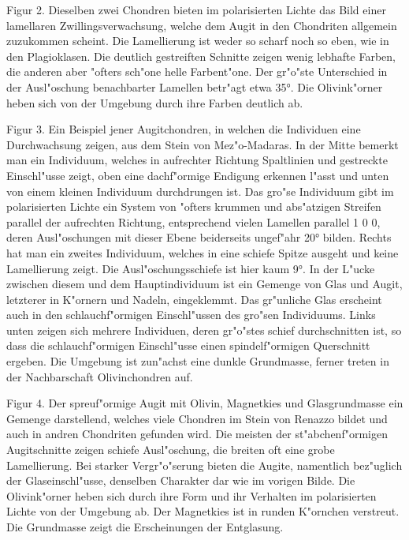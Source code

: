 \documentclass[a4paper, 11pt, oneside, polutonikogreek, german]{article}
\begin{document}
Figur 2. Dieselben zwei Chondren bieten im polarisierten Lichte das Bild einer lamellaren Zwillingsverwachsung, welche dem Augit in den Chondriten allgemein zuzukommen scheint. Die Lamellierung ist weder so scharf noch so eben, wie in den Plagioklasen. Die deutlich gestreiften Schnitte zeigen wenig lebhafte Farben, die anderen aber "ofters sch"one helle Farbent"one. Der gr"o"ste Unterschied in der Ausl"oschung benachbarter Lamellen betr"agt etwa 35°. Die Olivink"orner heben sich von der Umgebung durch ihre Farben deutlich ab.

Figur 3. Ein Beispiel jener Augitchondren, in welchen die Individuen eine Durchwachsung zeigen, aus dem Stein von Mez"o-Madaras. In der Mitte bemerkt man ein Individuum, welches in aufrechter Richtung Spaltlinien und gestreckte Einschl"usse zeigt, oben eine dachf"ormige Endigung erkennen l"asst und unten von einem kleinen Individuum durchdrungen ist. Das gro"se Individuum gibt im polarisierten Lichte ein System von "ofters krummen und abs"atzigen Streifen parallel der aufrechten Richtung, entsprechend vielen Lamellen parallel 1 0 0, deren Ausl"oschungen mit dieser Ebene beiderseits ungef"ahr 20° bilden. Rechts hat man ein zweites Individuum, welches in eine schiefe Spitze ausgeht und keine Lamellierung zeigt. Die Ausl"oschungsschiefe ist hier kaum 9°. In der L"ucke zwischen diesem und dem Hauptindividuum ist ein Gemenge von Glas und Augit, letzterer in K"ornern und Nadeln, eingeklemmt. Das gr"unliche Glas erscheint auch in den schlauchf"ormigen Einschl"ussen des gro"sen Individuums. Links unten zeigen sich mehrere Individuen, deren gr"o"stes schief durchschnitten ist, so dass die schlauchf"ormigen Einschl"usse einen spindelf"ormigen Querschnitt ergeben. Die Umgebung ist zun"achst eine dunkle Grundmasse, ferner treten in der Nachbarschaft Olivinchondren auf.

Figur 4. Der spreuf"ormige Augit mit Olivin, Magnetkies und Glasgrundmasse ein Gemenge darstellend, welches viele Chondren im Stein von Renazzo bildet und auch in andren Chondriten gefunden wird. Die meisten der st"abchenf"ormigen Augitschnitte zeigen schiefe Ausl"oschung, die breiten oft eine grobe Lamellierung. Bei starker Vergr"o"serung bieten die Augite, namentlich bez"uglich der Glaseinschl"usse, denselben Charakter dar wie im vorigen Bilde. Die Olivink"orner heben sich durch ihre Form und ihr Verhalten im polarisierten Lichte von der Umgebung ab. Der Magnetkies ist in runden K"ornchen verstreut. Die Grundmasse zeigt die Erscheinungen der Entglasung.
\clearpage
\end{document}
